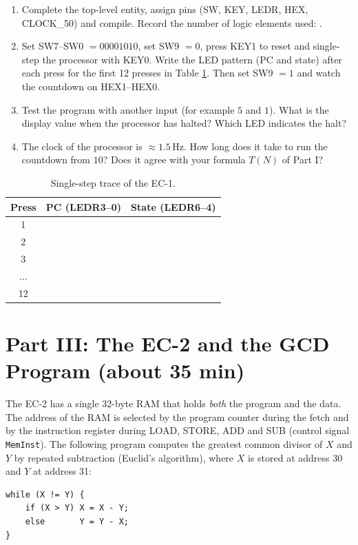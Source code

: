 \documentclass{article}
\begin{document}
\begin{enumerate}
    \item Complete the top-level entity, assign pins (SW, KEY, LEDR, HEX, CLOCK\_50) and compile. Record the number of logic elements used: \underline{\hspace{2cm}}.
    \item Set SW7--SW0 $= 00001010$, set SW9 $= 0$, press KEY1 to reset and single-step the processor with KEY0. Write the LED pattern (PC and state) after each press for the first 12 presses in Table \ref{tab:step}. Then set SW9 $= 1$ and watch the countdown on HEX1--HEX0.
    \item Test the program with another input (for example $5$ and $1$). What is the display value when the processor has halted? Which LED indicates the halt?
    \item The clock of the processor is $\approx 1.5\,\mathrm{Hz}$. How long does it take to run the countdown from $10$? Does it agree with your formula $T(N)$ of Part I?
\end{enumerate}

\begin{table}[H]
    \centering
    \begin{tabular}{|c|c|c|}
        \hline
        \textbf{Press} & \textbf{PC (LEDR3--0)} & \textbf{State (LEDR6--4)} \\
        \hline
        1 & & \\ \hline
        2 & & \\ \hline
        3 & & \\ \hline
        $\ldots$ & & \\ \hline
        12 & & \\ \hline
    \end{tabular}
    \caption{Single-step trace of the EC-1.}
    \label{tab:step}
\end{table}

\section*{Part III: The EC-2 and the GCD Program (about 35 min)}

The EC-2 has a single 32-byte RAM that holds \emph{both} the program and the data. The address of the RAM is selected by the program counter during the fetch and by the instruction register during LOAD, STORE, ADD and SUB (control signal \texttt{MemInst}). The following program computes the greatest common divisor of $X$ and $Y$ by repeated subtraction (Euclid's algorithm), where $X$ is stored at address 30 and $Y$ at address 31:
\begin{center}
\begin{minipage}{0.45\textwidth}
\begin{verbatim}
while (X != Y) {
    if (X > Y) X = X - Y;
    else       Y = Y - X;
}
\end{verbatim}
\end{minipage}
\end{center}
\end{document}
